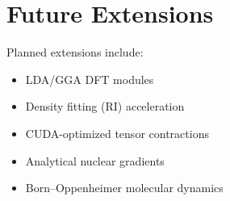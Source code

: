 \documentclass[11pt]{article}
\begin{document}
\section{Future Extensions}

Planned extensions include:

\begin{itemize}
\item LDA/GGA DFT modules
\item Density fitting (RI) acceleration
\item CUDA-optimized tensor contractions
\item Analytical nuclear gradients
\item Born--Oppenheimer molecular dynamics
\end{itemize}
\end{document}
